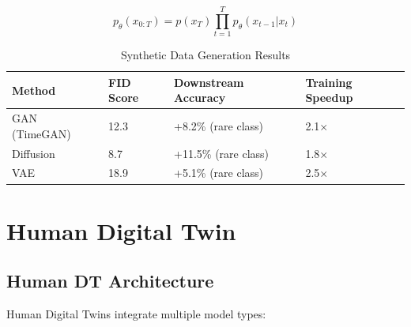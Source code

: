 \documentclass[12pt,a4paper]{article}
\begin{document}
\begin{equation}
p_\theta(x_{0:T}) = p(x_T) \prod_{t=1}^{T} p_\theta(x_{t-1}|x_t)
\end{equation}

\begin{table}[H]
\centering
\caption{Synthetic Data Generation Results}
\begin{tabular}{llll}
\toprule
\textbf{Method} & \textbf{FID Score} & \textbf{Downstream Accuracy} & \textbf{Training Speedup} \\
\midrule
GAN (TimeGAN) & 12.3 & +8.2\% (rare class) & 2.1$\times$ \\
Diffusion & 8.7 & +11.5\% (rare class) & 1.8$\times$ \\
VAE & 18.9 & +5.1\% (rare class) & 2.5$\times$ \\
\bottomrule
\end{tabular}
\end{table}

\section{Human Digital Twin}

\subsection{Human DT Architecture}

Human Digital Twins integrate multiple model types:
\end{document}
